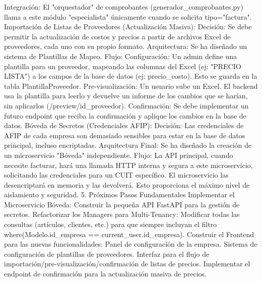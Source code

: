 Integración: El "orquestador" de comprobantes (generador_comprobantes.py) llama a este módulo "especialista" únicamente cuando se solicita tipo="factura".
Importación de Listas de Proveedores (Actualización Masiva):
Decisión: Se debe permitir la actualización de costos y precios a partir de archivos Excel de proveedores, cada uno con su propio formato.
Arquitectura: Se ha diseñado un sistema de Plantillas de Mapeo.
Flujo:
Configuración: Un admin define una plantilla para un proveedor, mapeando las columnas del Excel (ej: "PRECIO LISTA") a los campos de la base de datos (ej: precio_costo). Esto se guarda en la tabla PlantillaProveedor.
Pre-visualización: Un usuario sube un Excel. El backend usa la plantilla para leerlo y devuelve un informe de los cambios que se harían, sin aplicarlos (/preview/{id_proveedor}).
Confirmación: Se debe implementar un futuro endpoint que reciba la confirmación y aplique los cambios en la base de datos.
Bóveda de Secretos (Credenciales AFIP):
Decisión: Las credenciales de AFIP de cada empresa son demasiado sensibles para estar en la base de datos principal, incluso encriptadas.
Arquitectura Final: Se ha diseñado la creación de un microservicio "Bóveda" independiente.
Flujo: La API principal, cuando necesite facturar, hará una llamada HTTP interna y segura a este microservicio, solicitando las credenciales para un CUIT específico. El microservicio las desencriptará en memoria y las devolverá. Esto proporciona el máximo nivel de aislamiento y seguridad.
5. Próximos Pasos Fundamentales
Implementar el Microservicio Bóveda: Construir la pequeña API FastAPI para la gestión de secretos.
Refactorizar los Managers para Multi-Tenancy: Modificar todas las consultas (artículos, clientes, etc.) para que siempre incluyan el filtro where(Modelo.id_empresa == current_user.id_empresa).
Construir el Frontend para las nuevas funcionalidades:
Panel de configuración de la empresa.
Sistema de configuración de plantillas de proveedores.
Interfaz para el flujo de importación/pre-visualización/confirmación de listas de precios.
Implementar el endpoint de confirmación para la actualización masiva de precios.